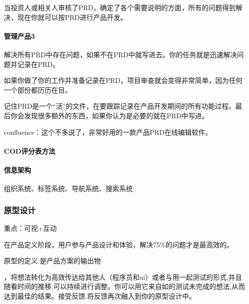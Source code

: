 \documentclass[letterpaper,11pt,english]{sphinxmanual}
\begin{document}
当投资人或相关人审核了PRD，确定了各个需要说明的方面，所有的问题得到解决，现在你就可以按PRD进行产品开发。


\paragraph{管理产品3\sphinxfootnotemark[183]}
\label{\detokenize{chapter_skill/PRD:id11}}%
\begin{footnotetext}[183]\sphinxAtStartFootnote
{}
%
\end{footnotetext}\ignorespaces 
解决所有PRD中存在问题，如果不在PRD中就写进去。你的任务就是迅速解决问题并记录在PRD。

如果你做了你的工作并准备记录在PRD，项目审查就会变得非常简单，因为任何一个部份都历历在目。

记住PRD是一个“活”的文件，在要跟踪记录在产品开发期间的所有功能过程。最后你会发现很多额外的东西，如果你认为是必要的就在PRD中写进。

confluence：这个不多说了，非常好用的一款产品PRD在线编辑软件。%
\begin{footnote}[184]\sphinxAtStartFootnote
{}
%
\end{footnote}


\paragraph{COD评分表方法}
\label{\detokenize{chapter_skill/PRD:cod}}

\paragraph{信息架构}
\label{\detokenize{chapter_skill/PRD:id12}}
组织系统、标签系统、导航系统、搜索系统


\subsubsection{原型设计}
\label{\detokenize{chapter_skill/prototype_design:id1}}\label{\detokenize{chapter_skill/prototype_design::doc}}
重点：可视+互动

在产品定义阶段，用户参与产品设计和体验，解决75\%的问题才是最高效的。

原型的定义:是产品方案的输出物
%
\begin{footnote}[185]\sphinxAtStartFootnote
{}
%
\end{footnote}，将想法转化为高效传达给其他人（程序员和ui）或者与用一起测试的形式,并且随看时间的推移,可以持续进行调整。你可以用它来自如的测试未完成的想法,从而达到最佳的结果。接受反馈,将反馈再次融入到你的原型设计中。
\end{document}
